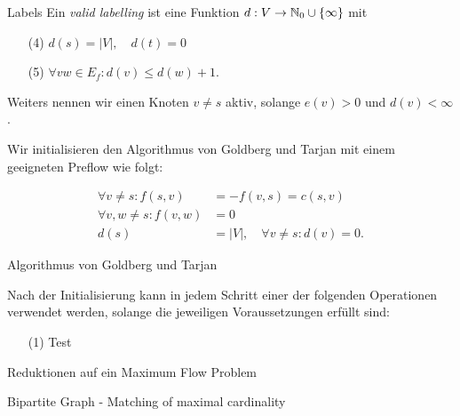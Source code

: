 \documentclass[aspectratio=169]{beamer}
\begin{document}
\begin{frame}{Labels}
  Ein \textit{valid labelling} ist eine Funktion $d: V \to \mathbb{N}_0 \cup \{\infty\}$ mit

  \begin{enumerate}
    \item[(4)] $d(s) = |V|, \quad d(t) = 0$
    \item[(5)] $\forall vw \in E_f: d(v) \leq d(w) + 1$.  
  \end{enumerate}

  Weiters nennen wir einen Knoten $v \neq s$ aktiv, solange $e(v) > 0$ und $d(v) < \infty$.

  Wir initialisieren den Algorithmus von Goldberg und Tarjan mit einem
  geeigneten Preflow wie folgt:

  \begin{align*}
    \forall v \neq s: f(s,v) &= -f(v,s) = c(s,v) \\
    \forall v,w \neq s: f(v,w) &= 0 \\
    d(s) &= |V|, \quad \forall v \neq s: d(v) = 0.
  \end{align*}
\end{frame}

\begin{frame}{Algorithmus von Goldberg und Tarjan}

  Nach der Initialisierung kann in jedem Schritt einer der folgenden
  Operationen verwendet werden, solange die jeweiligen Voraussetzungen erfüllt sind:

  \begin{algorithmus*}
    \begin{enumerate}
      \item[(1)] Test
    \end{enumerate}
  \end{algorithmus*}
  
\end{frame}

\begin{frame}{Reduktionen auf ein Maximum Flow Problem}
  
\end{frame}

\begin{frame}{Bipartite Graph - Matching of maximal cardinality}
  
\end{frame}
\end{document}
